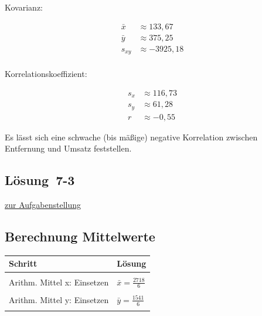 \documentclass[
  11pt,
  ngerman,
  a4paper,
]{report}
\begin{document}
Kovarianz:

\[\begin{aligned}
\bar{x} &\approx 133{,}67\\
\bar{y} &\approx 375{,}25\\
s_{xy}&\approx -3925{,}18\\
\end{aligned}\]

Korrelationskoeffizient:

\[\begin{aligned}
s_x &\approx 116{,}73\\
s_y &\approx 61{,}28\\
r &\approx -0{,}55
\end{aligned}\]

Es lässt sich eine schwache (bis mäßige) negative Korrelation zwischen Entfernung und Umsatz feststellen.

\hypertarget{loesung-7-3}{%
\subsection{Lösung~7-3}\label{loesung-7-3}}

\protect\hyperlink{aufgabe-7-3}{zur Aufgabenstellung}

\hypertarget{berechnung-mittelwerte}{%
\subsection{Berechnung Mittelwerte}\label{berechnung-mittelwerte}}

\begin{table}[H]
\centering
\begin{tabular}{>{\raggedright\arraybackslash}p{8cm}>{\raggedright\arraybackslash}p{8cm}}
\toprule
\textbf{Schritt} & \textbf{Lösung}\\
\midrule
\cellcolor{gray!6}{Arithm. Mittel: Formel} & \cellcolor{gray!6}{$\bar{x}=\frac{\sum\limits_{i=1}^{n}x_{i}}{n}$}\\
Arithm. Mittel x: Einsetzen & $\bar{x}=\frac{2718}{6}$\\
\cellcolor{gray!6}{Arithm. Mittel x: Ergebnis} & \cellcolor{gray!6}{$\bar{x}=453$}\\
Arithm. Mittel y: Einsetzen & $\bar{y}=\frac{1541}{6}$\\
\cellcolor{gray!6}{Arithm. Mittel y: Ergebnis} & \cellcolor{gray!6}{$\bar{y}=256{,}83$}\\
\bottomrule
\end{tabular}
\end{table}
\end{document}
